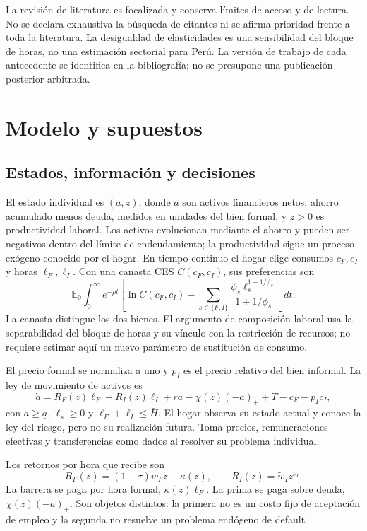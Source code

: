 \documentclass[11pt]{article}
\theoremstyle{definition}
\begin{document}
La revisión de literatura es focalizada y conserva límites de acceso y de lectura. No se declara exhaustiva la búsqueda de citantes ni se afirma prioridad frente a toda la literatura. La desigualdad de elasticidades es una sensibilidad del bloque de horas, no una estimación sectorial para Perú. La versión de trabajo de cada antecedente se identifica en la bibliografía; no se presupone una publicación posterior arbitrada.

\section{Modelo y supuestos}
\subsection{Estados, información y decisiones}
El estado individual es \((a,z)\), donde \(a\) son activos financieros netos, ahorro acumulado menos deuda, medidos en unidades del bien formal, y \(z>0\) es productividad laboral. Los activos evolucionan mediante el ahorro y pueden ser negativos dentro del límite de endeudamiento; la productividad sigue un proceso exógeno conocido por el hogar. En tiempo continuo el hogar elige consumos \(c_F,c_I\) y horas \(\ell_F,\ell_I\). Con una canasta CES \(C(c_F,c_I)\), sus preferencias son
\begin{equation}\label{eq:preferences}
\mathbb E_0\int_0^\infty e^{-\rho t}
\left[\ln C(c_F,c_I)-
\sum_{s\in\{F,I\}}\frac{\psi_s\ell_s^{1+1/\phi_s}}{1+1/\phi_s}\right]dt.
\end{equation}
La canasta distingue los dos bienes. El argumento de composición laboral usa la separabilidad del bloque de horas y su vínculo con la restricción de recursos; no requiere estimar aquí un nuevo parámetro de sustitución de consumo.

El precio formal se normaliza a uno y \(p_I\) es el precio relativo del bien informal. La ley de movimiento de activos es
\begin{equation}\label{eq:budget}
\dot a=R_F(z)\ell_F+R_I(z)\ell_I+ra-\chi(z)(-a)_+
+T-c_F-p_Ic_I,
\end{equation}
con \(a\geq\underline a\), \(\ell_s\geq0\) y
\(\ell_F+\ell_I\leq\bar H\). El hogar observa su estado actual y conoce la ley del riesgo, pero no su realización futura. Toma precios, remuneraciones efectivas y transferencias como dados al resolver su problema individual.

Los retornos por hora que recibe son
\begin{equation}\label{eq:returns}
R_F(z)=(1-\tau)w_Fz-\kappa(z),\qquad
R_I(z)=\widetilde w_Iz^{\nu_I}.
\end{equation}
La barrera se paga por hora formal, \(\kappa(z)\ell_F\). La prima se paga sobre deuda, \(\chi(z)(-a)_+\). Son objetos distintos: la primera no es un costo fijo de aceptación de empleo y la segunda no resuelve un problema endógeno de default.
\end{document}
